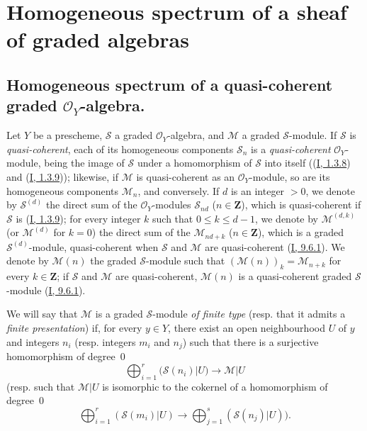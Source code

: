 \section{Homogeneous spectrum of a sheaf of graded algebras}
\label{section:II.3}

\subsection{Homogeneous spectrum of a quasi-coherent graded
$\mathcal{O}_Y$-algebra.}
\label{subsection:II.3.1}
\label{II.3.1}

\begin{env}[3.1.1]
\label{II.3.1.1}
Let $Y$ be a prescheme, $\mathcal{S}$ a graded $\mathcal{O}_Y$-algebra, and
$\mathcal{M}$ a graded $\mathcal{S}$-module. If $\mathcal{S}$ is
\emph{quasi-coherent}, each of its homogeneous components $\mathcal{S}_n$ is
a \emph{quasi-coherent} $\mathcal{O}_Y$-module, being the image of
$\mathcal{S}$ under a homomorphism of $\mathcal{S}$ into itself
((\hyperref[I.1.3.8]{I, 1.3.8}) and
(\hyperref[I.1.3.9]{I, 1.3.9})); likewise, if $\mathcal{M}$ is
quasi-coherent as an $\mathcal{O}_Y$-module, so are its homogeneous
components $\mathcal{M}_n$, and conversely. If $d$ is an integer $>0$, we
denote by $\mathcal{S}^{(d)}$ the direct sum of the
$\mathcal{O}_Y$-modules $\mathcal{S}_{nd}$ ($n\in\mathbf{Z}$), which is
quasi-coherent if $\mathcal{S}$ is
(\hyperref[I.1.3.9]{I, 1.3.9}); for every integer $k$ such that
$0\leq k\leq d-1$, we denote by $\mathcal{M}^{(d,k)}$ (or
$\mathcal{M}^{(d)}$ for $k=0$) the direct sum of the
$\mathcal{M}_{nd+k}$ ($n\in\mathbf{Z}$), which is a graded
$\mathcal{S}^{(d)}$-module, quasi-coherent when $\mathcal{S}$ and
$\mathcal{M}$ are quasi-coherent (\hyperref[I.9.6.1]{I, 9.6.1}). We
denote by $\mathcal{M}(n)$ the graded $\mathcal{S}$-module such that
$(\mathcal{M}(n))_k=\mathcal{M}_{n+k}$ for every $k\in\mathbf{Z}$; if
$\mathcal{S}$ and $\mathcal{M}$ are quasi-coherent, $\mathcal{M}(n)$ is a
quasi-coherent graded $\mathcal{S}$-module
(\hyperref[I.9.6.1]{I, 9.6.1}).

We will say that $\mathcal{M}$ is a graded $\mathcal{S}$-module
\emph{of finite type} (resp. that it admits a \emph{finite presentation}) if,
for every $y\in Y$, there exist an open neighbourhood $U$ of $y$ and integers
$n_i$ (resp. integers $m_i$ and $n_j$) such that there is a surjective
homomorphism of degree~$0$
\[
  \bigoplus_{i=1}^r(\mathcal{S}(n_i)|U)\longrightarrow\mathcal{M}|U
\]
(resp. such that $\mathcal{M}|U$ is isomorphic to the cokernel of a
homomorphism of degree~$0$
\[
  \bigoplus_{i=1}^r(\mathcal{S}(m_i)|U)
  \longrightarrow\bigoplus_{j=1}^s(\mathcal{S}(n_j)|U)).
\]


\end{env}
